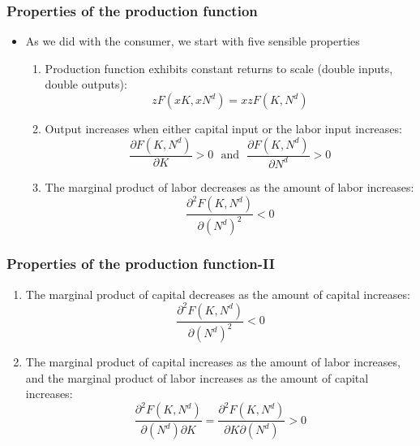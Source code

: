 \documentclass{beamer}
\begin{document}
\begin{frame}
\frametitle[alignment=center]{Properties of the production function}
\begin{itemize}
\item As we did with the consumer, we start with five sensible properties
\begin{enumerate}
\item Production function exhibits constant returns to scale (double inputs, double outputs):
$$zF(xK,xN^d)=xzF(K,N^d)$$
\item Output increases when either capital input or the labor input increases:
$$\frac{\partial F(K,N^d)}{\partial K}>0\ \ \ \text{and} \ \ \ \frac{\partial F(K,N^d)}{\partial N^d}>0$$
\item The marginal product of labor decreases as the amount of labor increases:
$$\frac{\partial^2 F(K,N^d)}{\partial (N^d)^2}<0$$
\end{enumerate}
\end{itemize}
\end{frame}

\begin{frame}
\frametitle[alignment=center]{Properties of the production function-II}
\begin{enumerate}\addtocounter{enumi}{3}
\item The marginal product of capital decreases as the amount of capital increases:
$$\frac{\partial^2 F(K,N^d)}{\partial (N^d)^2}<0$$
\item The marginal product of capital increases as the amount of labor increases, and the marginal product of labor increases as the amount of capital increases:
$$\frac{\partial^2 F(K,N^d)}{\partial (N^d)\partial K}=\frac{\partial^2 F(K,N^d)}{\partial K \partial (N^d)}>0$$
\end{enumerate}
\end{frame}
\end{document}
